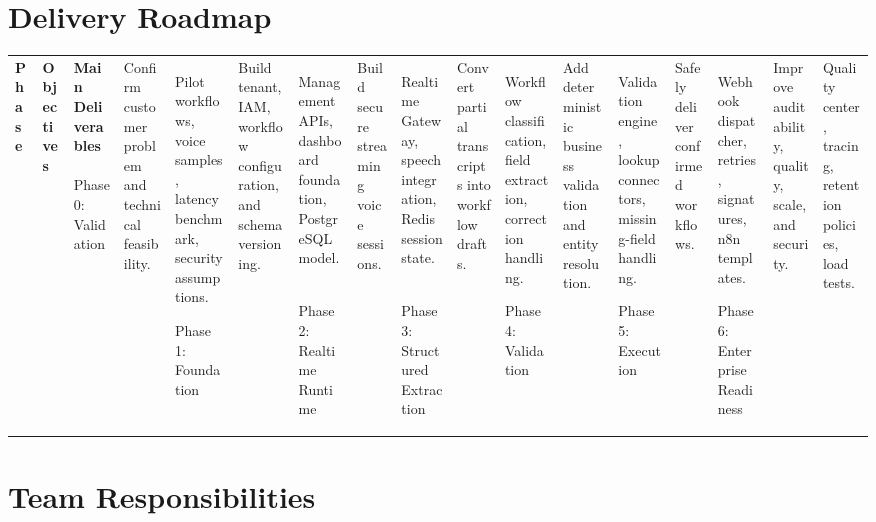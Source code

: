 \documentclass[11pt,a4paper]{article}
\begin{document}
\section{Delivery Roadmap}

\begin{tabularx}{\textwidth}{L{28mm}Y Y}
\toprule
\textbf{Phase} & \textbf{Objectives} & \textbf{Main Deliverables} \
\midrule
Phase 0:
Validation
&
Confirm customer problem and technical feasibility.
&
Pilot workflows, voice samples, latency benchmark, security assumptions. \

Phase 1:
Foundation
&
Build tenant, IAM, workflow configuration, and schema versioning.
&
Management APIs, dashboard foundation, PostgreSQL model. \

Phase 2:
Realtime Runtime
&
Build secure streaming voice sessions.
&
Realtime Gateway, speech integration, Redis session state. \

Phase 3:
Structured Extraction
&
Convert partial transcripts into workflow drafts.
&
Workflow classification, field extraction, correction handling. \

Phase 4:
Validation
&
Add deterministic business validation and entity resolution.
&
Validation engine, lookup connectors, missing-field handling. \

Phase 5:
Execution
&
Safely deliver confirmed workflows.
&
Webhook dispatcher, retries, signatures, n8n templates. \

Phase 6:
Enterprise Readiness
&
Improve auditability, quality, scale, and security.
&
Quality center, tracing, retention policies, load tests. \
\bottomrule
\end{tabularx}

\section{Team Responsibilities}
\end{document}
